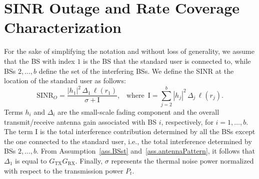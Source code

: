 \documentclass[10pt,journal,a4paper]{IEEEtran}
\begin{document}
\section{SINR Outage and Rate Coverage Characterization}\label{sec.sinr}
For the sake of simplifying the notation and without loss of generality, we assume that the BS with index $1$ is the BS that the standard user is connected to, while BSs $2, \ldots, b$ define the set of the interfering BSs. We define the SINR at the location of the standard user as follows:
\begin{equation}
\!\mathrm{SINR}_O = \frac{|h_1|^2 \, \Delta_1 \,\ell(r_1)}{\sigma + \mathrm{I}}, \,\,\,\,\,\text{where}\,\,\, \mathrm{I} = \sum_{j = 2}^b |h_j|^2 \,\Delta_j\, \ell(r_j).\!\!\!\!\label{eq.sinr_O}
\end{equation}
Terms $h_i$ and $\Delta_i$ are the small-scale fading component and the overall transmit/receive antenna gain associated with BS $i$, respectively, for $i = 1, \ldots, b$. The term $\mathrm{I}$ is the total interference contribution determined by all the BSs except the one connected to the standard user, i.e., the total interference determined by BSs $2, \ldots, b$. From Assumption~\ref{ass.BSst} and~\ref{ass.antennaPattern}, it follows that $\Delta_1$ is equal to $G_{\mathrm{TX}}G_{\mathrm{RX}}$. Finally, $\sigma$ represents the thermal noise power normalized with respect to the transmission power $P_t$.
\end{document}
